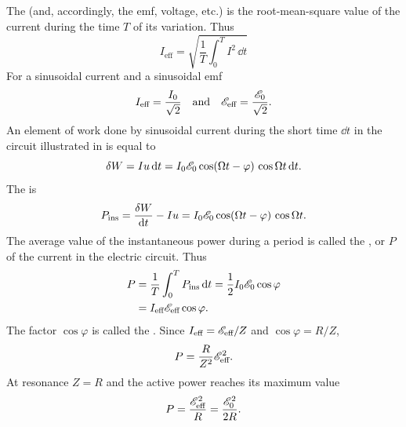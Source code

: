 \subsection{}\label{29.3.6} The  (and, accordingly, the emf, voltage, etc.) is the root-mean-square value of the current during the time $T$ of its variation. Thus
\begin{equation*}%
I_{\text{eff}} = \sqrt{\frac{1}{T}\int_{0}^{T} I^{2} \, \dd t }
\end{equation*}
For a sinusoidal current and a sinusoidal emf
\begin{equation*}%
I_{\text{eff}} = \frac{I_{0}}{\sqrt{2}} \qand \emf_{\text{eff}}
 = \frac{\emf_{0}}{\sqrt{2}}. 
\end{equation*}
An element of work done by sinusoidal current during the short time $\dd t$ in the circuit illustrated in  is equal to
\begin{equation*}%
\delta W = I u \, \dd t = I_{0}\emf_{0} \cos (\Omega t - \varphi) \, \cos \Omega t \, \dd t.
\end{equation*}
The  is
\begin{equation*}%
P_{\text{ins}} = \frac{\delta W}{\dd t} - Iu = I_{0}\emf_{0} \cos (\Omega t - \varphi) \, \cos \Omega t.
\end{equation*}
The average value of the instantaneous power during a period is called the , or  $P$ of the current in the electric circuit. Thus
\begin{align*}%
P & = \frac{1}{T} \int_{0}^{T} P_{\text{ins}} \, \dd t = \frac{1}{2} I_{0}\emf_{0} \cos \varphi \\
& = I_{\text{eff}}\emf_{\text{eff}} \cos \varphi.
\end{align*}
The factor $\cos \varphi$ is called the . Since $I_{\text{eff}} = \mathscr{E}_{\text{eff}}/Z$ and $\cos \varphi = R/Z$,
\begin{equation*}%
P  = \frac{R}{Z^{2}}\emf_{\text{eff}}^{2}.
\end{equation*}
At resonance $Z = R$ and the active power reaches its maximum value
\begin{equation*}%
P  = \frac{\emf_{\text{eff}}^{2}}{R} = \frac{\emf_{0}^{2}}{2R}.
\end{equation*}

